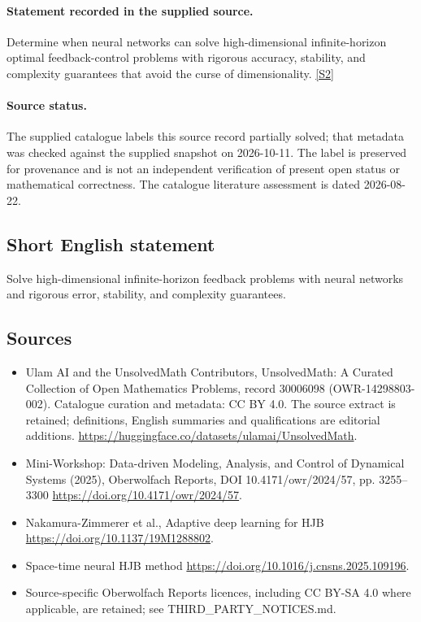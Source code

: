 \documentclass[11pt]{article}
\begin{document}
\paragraph{Statement recorded in the supplied source.}
Determine when neural networks can solve high-dimensional infinite-horizon optimal feedback-control problems with rigorous accuracy, stability, and complexity guarantees that avoid the curse of dimensionality. \href{https://doi.org/10.4171/owr/2024/57}{[S2]}
\paragraph{Source status.}
The supplied catalogue labels this source record partially solved; that metadata was checked against the supplied snapshot on 2026-10-11. The label is preserved for provenance and is not an independent verification of present open status or mathematical correctness. The catalogue literature assessment is dated 2026-08-22.
\subsection{Short English statement}
Solve high-dimensional infinite-horizon feedback problems with neural networks and rigorous error, stability, and complexity guarantees.
\subsection{Sources}
\begin{itemize}
\item[S1] Ulam AI and the UnsolvedMath Contributors, UnsolvedMath: A Curated Collection of Open Mathematics Problems, record 30006098 (OWR-14298803-002). Catalogue curation and metadata: CC BY 4.0. The source extract is retained; definitions, English summaries and qualifications are editorial additions.
\url{https://huggingface.co/datasets/ulamai/UnsolvedMath}.
\item[S2] Mini-Workshop: Data-driven Modeling, Analysis, and Control of Dynamical Systems (2025), Oberwolfach Reports, DOI 10.4171/owr/2024/57, pp. 3255--3300
\url{https://doi.org/10.4171/owr/2024/57}.
\item[S3] Nakamura-Zimmerer et al., Adaptive deep learning for HJB
\url{https://doi.org/10.1137/19M1288802}.
\item[S4] Space-time neural HJB method
\url{https://doi.org/10.1016/j.cnsns.2025.109196}.
\item Source-specific Oberwolfach Reports licences, including CC BY-SA 4.0 where applicable, are retained; see THIRD\_PARTY\_NOTICES.md.
\end{itemize}
\end{document}
